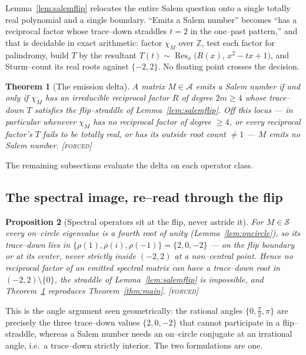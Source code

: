 \documentclass[11pt]{article}
\theoremstyle{plain}
\newtheorem{theorem}{Theorem}[section]
\newtheorem{proposition}[theorem]{Proposition}
\theoremstyle{definition}
\theoremstyle{remark}
\newcommand{\forced}{\textcolor{forcedc}{\textsc{[forced]}}}
\newcommand{\Z}{\mathbb{Z}}
\newcommand{\charp}{\chi}
\newcommand{\Scal}{\mathcal{S}}
\newcommand{\Acal}{\mathcal{A}}
\begin{document}
Lemma~\ref{lem:salemflip} relocates the entire Salem question onto a single totally real polynomial and a single boundary. ``Emits a Salem number'' becomes ``has a reciprocal factor whose trace--down straddles $t=2$ in the one--past pattern,'' and that is decidable in exact arithmetic: factor $\charp_M$ over $\Z$, test each factor for palindromy, build $T$ by the resultant $T(t)\sim\operatorname{Res}_x\!\big(R(x),\,x^2-tx+1\big)$, and Sturm--count its real roots against $\{-2,2\}$. No floating point crosses the decision.

\begin{theorem}[The emission delta]\label{thm:delta}
A matrix $M\in\Acal$ emits a Salem number if and only if $\charp_M$ has an irreducible reciprocal factor $R$ of degree $2m\ge4$ whose trace--down $T$ satisfies the flip--straddle of Lemma~\ref{lem:salemflip}. Off this locus --- in particular whenever $\charp_M$ has no reciprocal factor of degree $\ge4$, or every reciprocal factor's $T$ fails to be totally real, or has its outside root count $\ne1$ --- $M$ emits no Salem number. \forced
\end{theorem}

The remaining subsections evaluate the delta on each operator class.

\subsection{The spectral image, re--read through the flip}\label{sec:specflip}

\begin{proposition}[Spectral operators sit at the flip, never astride it]\label{prop:specflip}
For $M\in\Scal$ every on--circle eigenvalue is a fourth root of unity (Lemma~\ref{lem:oncircle}), so its trace--down lies in $\{\rho(1),\rho(i),\rho(-1)\}=\{2,0,-2\}$ --- \emph{on} the flip boundary or at its center, never strictly inside $(-2,2)$ at a non--central point. Hence no reciprocal factor of an emitted spectral matrix can have a trace--down root in $(-2,2)\setminus\{0\}$, the straddle of Lemma~\ref{lem:salemflip} is impossible, and Theorem~\ref{thm:delta} reproduces Theorem~\ref{thm:main}. \forced
\end{proposition}

This is the angle argument seen geometrically: the rational angles $\{0,\tfrac\pi2,\pi\}$ are precisely the three trace--down values $\{2,0,-2\}$ that cannot participate in a flip--straddle, whereas a Salem number needs an on--circle conjugate at an irrational angle, i.e.\ a trace--down strictly interior. The two formulations are one.
\end{document}
